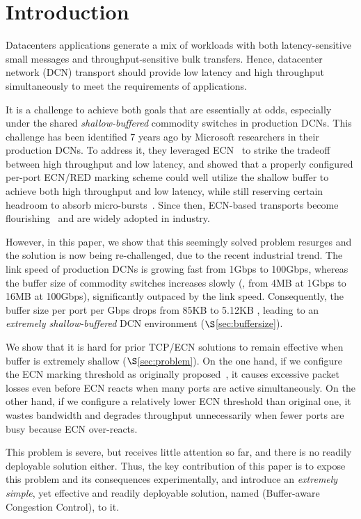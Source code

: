 \vspace{-2mm}
\section{Introduction}\label{sec:intro}
Datacenters applications generate a mix of workloads with both latency-sensitive small messages and throughput-sensitive bulk transfers. Hence, datacenter network (DCN) transport should provide low latency and high throughput simultaneously to meet the requirements of applications.

It is a challenge to achieve both goals that are essentially at odds, especially under the shared \emph{shallow-buffered} commodity switches in production DCNs. This challenge has been identified 7 years ago by Microsoft researchers in their production DCNs. To address it, they leveraged ECN~\cite{ecn} to strike the tradeoff between high throughput and low latency, and showed that a properly configured per-port ECN/RED marking scheme could well utilize the shallow buffer to achieve both high throughput and low latency, while still reserving certain headroom to absorb micro-bursts~\cite{dctcp}. Since then, ECN-based transports become flourishing~\cite{dctcp,d2tcp,tuning,l2dct} and are widely adopted in industry.

However, in this paper, we show that this seemingly solved problem resurges and the solution is now being re-challenged, due to the recent industrial trend. The link speed of production DCNs is growing fast from 1Gbps to 100Gbps, whereas the buffer size of commodity switches increases slowly (\eg, from 4MB at 1Gbps to 16MB at 100Gbps), significantly outpaced by the link speed. Consequently, the buffer size per port per Gbps drops from 85KB to 5.12KB , leading to an \emph{extremely shallow-buffered} DCN environment ($\S$\ref{sec:buffersize}).

We show that it is hard for prior TCP/ECN solutions to remain effective when buffer is extremely shallow ($\S$\ref{sec:problem}). On the one hand, if we configure the ECN marking threshold as originally proposed~\cite{dctcp,tuning}, it causes excessive packet losses even before ECN reacts when many ports are active simultaneously. On the other hand, if we configure a relatively lower ECN threshold than original one, it wastes bandwidth and degrades throughput unnecessarily when fewer ports are busy because ECN over-reacts.

This problem is severe, but receives little attention so far, and there is no readily deployable solution either. Thus, the key contribution of this paper is to expose this problem and its consequences experimentally, and introduce an \emph{extremely simple}, yet effective and readily deployable solution, named \textbf{\sys} (Buffer-aware Congestion Control), to it.

